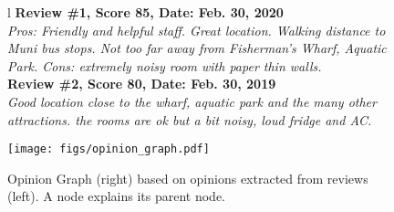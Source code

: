\begin{figure*}[t]
\begin{minipage}[t][][b]{0.45\textwidth}
\centering
\begin{mdframed}
\small
\begin{tabular}{l}%
\textbf{Review \#1, Score 85, Date: Feb. 30, 2020}  \\
 {\it Pros: Friendly and helpful staff. Great location. Walking distance to Muni bus stops. Not too far away from Fisherman's Wharf, Aquatic Park. Cons: extremely noisy room with paper thin walls.}  \\ \bottomrule
\textbf{Review \#2, Score 80, Date: Feb. 30, 2019}  \\
 {\it Good location close to the wharf, aquatic park and the many other attractions. the rooms are ok but a bit noisy, loud fridge and AC.
}  \\%
\end{tabular}
\end{mdframed}
\vspace{-2mm}
\end{minipage}
\begin{minipage}[t][][b]{0.5\textwidth}
\vspace{2mm}
\texttt{[image: figs/opinion\_graph.pdf]}
\end{minipage}
    \caption{Opinion Graph (right) based on opinions extracted from reviews (left). A node explains its parent node.}
\label{fig:example}
\end{figure*}


